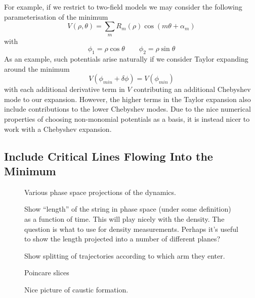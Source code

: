 \documentclass[11pt,a4paper]{article}
\begin{document}
For example, if we restrict to two-field models we may consider the following parameterisation of the minimum
\begin{equation}
  V(\rho,\theta) = \sum_{m} R_m(\rho)\cos(m\theta + \alpha_m)
\end{equation}
with
\begin{equation}
  \phi_1 = \rho\cos\theta \qquad \phi_2 = \rho\sin\theta
\end{equation}
As an example, such potentials arise naturally if we consider Taylor expanding around the minimum
\begin{equation}
  V(\phi_{min}+\delta\phi) = V(\phi_{min})
\end{equation}
with each additional derivative term in $V$ contributing an additional Chebyshev mode to our expansion.
However, the higher terms in the Taylor expansion also include contributions to the lower Chebyshev modes.
Due to the nice numerical properties of choosing non-monomial potentials as a basis, it is instead nicer to work with a Chebyshev expansion.

\subsection{Include Critical Lines Flowing Into the Minimum}


\begin{figure}
  \caption{Various phase space projections of the dynamics.}
\end{figure}

\begin{figure}
  \caption{Show ``length'' of the string in phase space (under some definition) as a function of time.  This will play nicely with the density.  The question is what to use for density measurements.  Perhaps it's useful to show the length projected into a number of different planes?}
\end{figure}

\begin{figure}
  \caption{Show splitting of trajectories according to which arm they enter.}
\end{figure}

\begin{figure}
  \caption{Poincare slices}
\end{figure}

\begin{figure}
  \caption{Nice picture of caustic formation.}
\end{figure}
\end{document}
